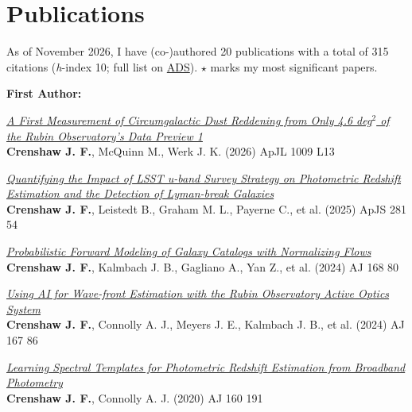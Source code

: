 \section{Publications}

As of November 2026, I have (co-)authored 20 publications with a total of 315 citations (\textit{h}-index 10; full list on \href{https://ui.adsabs.harvard.edu/public-libraries/p11_8_nYTjuAD1LbKfZC5g}{ADS}). $\star$ marks my most significant papers. \vspace{2mm}

\textbf{First Author:}

\begin{etaremune}
\item \keypaper \href{https://ui.adsabs.harvard.edu/abs/2026ApJ..1009L..13C}{\textit{A First Measurement of Circumgalactic Dust Reddening from Only 4.6 deg$^{2}$ of the Rubin Observatory's Data Preview 1}} \\
\textbf{Crenshaw J. F.}, McQuinn M., Werk J. K. (2026)
ApJL 1009 L13

\item \keypaper \href{https://ui.adsabs.harvard.edu/abs/2025ApJS..281...54C}{\textit{Quantifying the Impact of LSST u-band Survey Strategy on Photometric Redshift Estimation and the Detection of Lyman-break Galaxies}} \\
\textbf{Crenshaw J. F.}, Leistedt B., Graham M. L., Payerne C., et al. (2025)
ApJS 281 54

\item \keypaper \href{https://ui.adsabs.harvard.edu/abs/2024AJ....168...80C}{\textit{Probabilistic Forward Modeling of Galaxy Catalogs with Normalizing Flows}} \\
\textbf{Crenshaw J. F.}, Kalmbach J. B., Gagliano A., Yan Z., et al. (2024)
AJ 168 80

\item \href{https://ui.adsabs.harvard.edu/abs/2024AJ....167...86C}{\textit{Using AI for Wave-front Estimation with the Rubin Observatory Active Optics System}} \\
\textbf{Crenshaw J. F.}, Connolly A. J., Meyers J. E., Kalmbach J. B., et al. (2024)
AJ 167 86

\item \href{https://ui.adsabs.harvard.edu/abs/2020AJ....160..191C}{\textit{Learning Spectral Templates for Photometric Redshift Estimation from Broadband Photometry}} \\
\textbf{Crenshaw J. F.}, Connolly A. J. (2020)
AJ 160 191

\end{etaremune}

